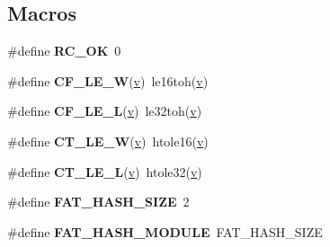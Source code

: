 \subsection*{Macros}
\begin{DoxyCompactItemize}
\item 
\mbox{\label{group__libfs__dosfs_gac96a9e3f6c17299d532eb572ef0ea415}} 
\#define {\bfseries R\+C\+\_\+\+OK}~0
\item 
\mbox{\label{group__libfs__dosfs_ga15415f034502aee5ff19a393fa7a1a35}} 
\#define {\bfseries C\+F\+\_\+\+L\+E\+\_\+W}(\mbox{\hyperlink{sun4u_2tte_8h_a0b943bd7a9fc74d6635879a38dc16894}{v}})~le16toh(\mbox{\hyperlink{sun4u_2tte_8h_a0b943bd7a9fc74d6635879a38dc16894}{v}})
\item 
\mbox{\label{group__libfs__dosfs_ga82062bd82ec1bd80334617c60f280ac7}} 
\#define {\bfseries C\+F\+\_\+\+L\+E\+\_\+L}(\mbox{\hyperlink{sun4u_2tte_8h_a0b943bd7a9fc74d6635879a38dc16894}{v}})~le32toh(\mbox{\hyperlink{sun4u_2tte_8h_a0b943bd7a9fc74d6635879a38dc16894}{v}})
\item 
\mbox{\label{group__libfs__dosfs_gad2d1bd64b87aa5b53b6f9706f21520d2}} 
\#define {\bfseries C\+T\+\_\+\+L\+E\+\_\+W}(\mbox{\hyperlink{sun4u_2tte_8h_a0b943bd7a9fc74d6635879a38dc16894}{v}})~htole16(\mbox{\hyperlink{sun4u_2tte_8h_a0b943bd7a9fc74d6635879a38dc16894}{v}})
\item 
\mbox{\label{group__libfs__dosfs_ga3ccf480b114859cf0bedfa0bb9eefe7a}} 
\#define {\bfseries C\+T\+\_\+\+L\+E\+\_\+L}(\mbox{\hyperlink{sun4u_2tte_8h_a0b943bd7a9fc74d6635879a38dc16894}{v}})~htole32(\mbox{\hyperlink{sun4u_2tte_8h_a0b943bd7a9fc74d6635879a38dc16894}{v}})
\item 
\mbox{\label{group__libfs__dosfs_gaf820d903caa27071bbb37009a60d4e36}} 
\#define {\bfseries F\+A\+T\+\_\+\+H\+A\+S\+H\+\_\+\+S\+I\+ZE}~2
\item 
\mbox{\label{group__libfs__dosfs_gaff065675727d23f73e39f498bd534010}} 
\#define {\bfseries F\+A\+T\+\_\+\+H\+A\+S\+H\+\_\+\+M\+O\+D\+U\+LE}~F\+A\+T\+\_\+\+H\+A\+S\+H\+\_\+\+S\+I\+ZE
\item 
\mbox{\label{group__libfs__dosfs_ga0a7ab4839b78f7a31567a9b0577dd33c}} 

\end{DoxyCompactItemize}
